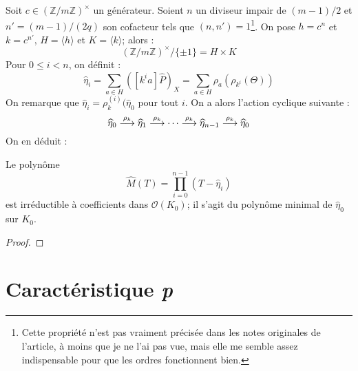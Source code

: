 \documentclass[a4paper]{article} %
\newcommand\zmodninv[1]{(\mathbb{Z}/#1\mathbb{Z})^{\times}}
\newcommand\EO{\mathcal{O}}
\newcommand\groupgen[1]{\langle{#1}\rangle}
\begin{document}
Soit $c\in\zmodninv{m}$ un générateur. Soient $n$ un diviseur impair de
$(m-1)/2$ et $n' = (m-1)/(2q)$ son cofacteur tels que $(n, n') =
1$\footnote{Cette propriété n'est pas vraiment précisée dans les notes
originales de l'article, à moins que je ne l'ai pas vue, mais elle me semble
assez indispensable pour que les ordres fonctionnent bien.}. On pose 
$h = c^n$ et $k = c^{n'}$, $H = \groupgen{h}$ et $K = \groupgen{k}$; alors :
\[
\zmodninv{m}/\lbrace{\pm1}\rbrace = H \times K
\]
Pour $0 \leq i < n$, on définit :
\[
\widehat{\eta}_i = \sum_{a\in H}{\left([k^ia]\widehat{P}\right)_X} = \sum_{a\in
H}{\rho_a(\rho_{k^i}(\Theta))}
\]
On remarque que $\widehat{\eta}_i = \rho_k^{(i)}(\widehat{\eta}_0$ pour tout
$i$. On a alors l'action cyclique suivante :
\[\widehat{\eta}_0 \buildrel\rho_k\over\longrightarrow
\widehat{\eta}_1 \buildrel\rho_k\over\longrightarrow \dots 
\buildrel\rho_k\over\longrightarrow \widehat{\eta}_{n-1}
\buildrel\rho_k\over\longrightarrow \widehat{\eta}_0\]
On en déduit :
\begin{lem}
Le polynôme 
\[
\widehat{M}(T) = \prod_{i = 0}^{n - 1}{(T - \widehat{\eta}_i)}
\]
est irréductible à coefficients dans $\EO(K_0)$; il s'agit du polynôme minimal de
$\widehat{\eta}_0$ sur $K_0$.
\end{lem}
\begin{proof}
\end{proof}

\section{Caractéristique \emph{p}}
\end{document}
